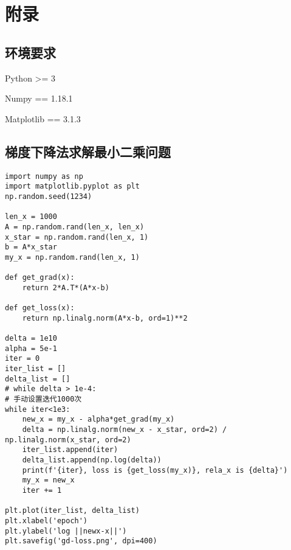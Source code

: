 \section{附录}

\subsection{环境要求}
Python >= 3

Numpy == 1.18.1

Matplotlib == 3.1.3

\subsection{梯度下降法求解最小二乘问题}
\begin{lstlisting}
import numpy as np
import matplotlib.pyplot as plt
np.random.seed(1234)

len_x = 1000
A = np.random.rand(len_x, len_x)
x_star = np.random.rand(len_x, 1)
b = A*x_star
my_x = np.random.rand(len_x, 1)

def get_grad(x):
    return 2*A.T*(A*x-b)

def get_loss(x):
    return np.linalg.norm(A*x-b, ord=1)**2

delta = 1e10
alpha = 5e-1
iter = 0
iter_list = []
delta_list = []
# while delta > 1e-4:
# 手动设置迭代1000次
while iter<1e3:
    new_x = my_x - alpha*get_grad(my_x)
    delta = np.linalg.norm(new_x - x_star, ord=2) / np.linalg.norm(x_star, ord=2)
    iter_list.append(iter)
    delta_list.append(np.log(delta))
    print(f'{iter}, loss is {get_loss(my_x)}, rela_x is {delta}')
    my_x = new_x
    iter += 1

plt.plot(iter_list, delta_list)
plt.xlabel('epoch')
plt.ylabel('log ||newx-x||')
plt.savefig('gd-loss.png', dpi=400)
\end{lstlisting}

